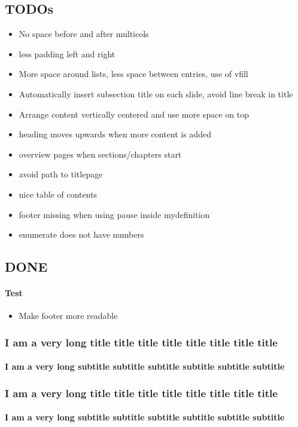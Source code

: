 \documentclass[8pt, aspectratio=169, table, setspace, fixcmex]{beamer}
\begin{document}
\subsection{TODOs}
\begin{frame}{\insertsubsection}
	\begin{itemize}
		\item No space before and after multicols
		\item less padding left and right
		\item More space around lists, less space between entries, use of vfill
		\item Automatically insert subsection title on each slide, avoid line break in title
		\item Arrange content vertically centered and use more space on top
		\item heading moves upwards when more content is added
		\item overview pages when sections/chapters start
		\item avoid path to titlepage
		\item nice table of contents
		\item footer missing when using pause inside mydefinition
		\item enumerate does not have numbers
	\end{itemize}
\end{frame}

\subsection{DONE}
\begin{frame}{\insertsubsection}
	\framesubtitle{Test}
	\begin{itemize}
		\item Make footer more readable
	\end{itemize}
\end{frame}


\begin{frame}
	\frametitle{I am a very long title title title title title title title title}
	\framesubtitle{I am a very long subtitle subtitle subtitle subtitle subtitle subtitle}
	
	\lipsum
\end{frame}
\begin{frame}
	\frametitle{I am a very long title title title title title title title title}
	\framesubtitle{I am a very long subtitle subtitle subtitle subtitle subtitle subtitle}
	
\end{frame}
\end{document}
